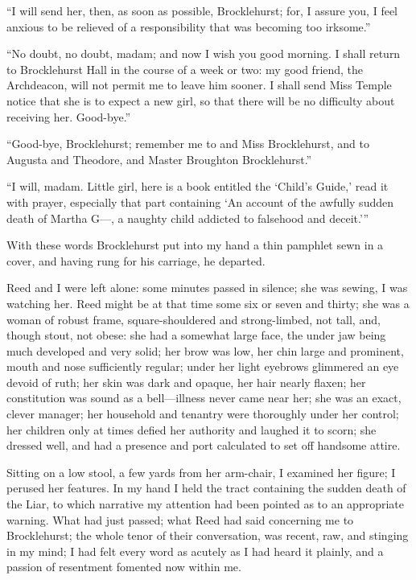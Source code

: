 \enquote{I will send her, then, as soon as possible, \Mr{} Brocklehurst;
	for, I assure you, I feel anxious to be relieved of a responsibility
	that was becoming too irksome.}

\enquote{No doubt, no doubt, madam; and now I wish you good morning. I
	shall return to Brocklehurst Hall in the course of a week or two: my
	good friend, the Archdeacon, will not permit me to leave him sooner. I
	shall send Miss Temple notice that she is to expect a new girl, so that
	there will be no difficulty about receiving her. Good-bye.}

\enquote{Good-bye, \Mr{} Brocklehurst; remember me to \Mrs{} and Miss
	Brocklehurst, and to Augusta and Theodore, and Master Broughton
	Brocklehurst.}

\enquote{I will, madam. Little girl, here is a book entitled the
	\enquote{Child's Guide,} read it with prayer, especially that part
	containing \enquote{An account of the awfully sudden death of Martha
		G---, a naughty child addicted to falsehood and deceit.}}

With these words \Mr{} Brocklehurst put into my hand a thin pamphlet sewn
in a cover, and having rung for his carriage, he departed.

\Mrs{} Reed and I were left alone: some minutes passed in silence; she was
sewing, I was watching her. \Mrs{} Reed might be at that time some six or
seven and thirty; she was a woman of robust frame, square-shouldered and
strong-limbed, not tall, and, though stout, not obese: she had a
somewhat large face, the under jaw being much developed and very solid;
her brow was low, her chin large and prominent, mouth and nose
sufficiently regular; under her light eyebrows glimmered an eye devoid
of ruth; her skin was dark and opaque, her hair nearly flaxen; her
constitution was sound as a bell---illness never came near her; she was
an exact, clever manager; her household and tenantry were thoroughly
under her control; her children only at times defied her authority and
laughed it to scorn; she dressed well, and had a presence and port
calculated to set off handsome attire.

Sitting on a low stool, a few yards from her arm-chair, I examined her
figure; I perused her features. In my hand I held the tract containing
the sudden death of the Liar, to which narrative my attention had been
pointed as to an appropriate warning. What had just passed; what \Mrs{}
Reed had said concerning me to \Mr{} Brocklehurst; the whole tenor of
their conversation, was recent, raw, and stinging in my mind; I had felt
every word as acutely as I had heard it plainly, and a passion of
resentment fomented now within me.

